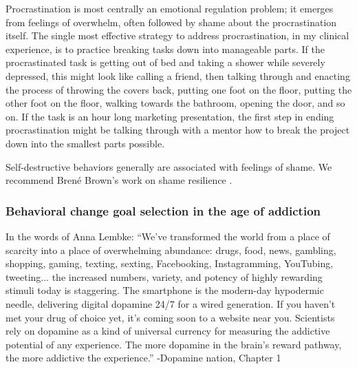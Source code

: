 \documentclass[12pt,letterpaper]{article}
\begin{document}
Procrastination is most centrally an emotional regulation problem; it emerges from feelings of overwhelm, often followed by shame about the procrastination itself. The single most effective strategy to address procrastination, in my clinical experience, is to practice breaking tasks down into manageable parts. If the procrastinated task is getting out of bed and taking a shower while severely depressed, this might look like calling a friend, then talking through and enacting the process of throwing the covers back, putting one foot on the floor, putting the other foot on the floor, walking towards the bathroom, opening the door, and so on. If the task is an hour long marketing presentation, the first step in ending procrastination might be talking through with a mentor how to break the project down into the smallest parts possible.

Self-destructive behaviors generally are associated with feelings of shame. We recommend Brené Brown's work on shame resilience \cite{brownThought}.

\subsubsection*{Behavioral change goal selection in the age of addiction}

In the words of Anna Lembke: “We've transformed the world from a place of scarcity into a place of overwhelming abundance: drugs, food, news, gambling, shopping, gaming, texting, sexting, Facebooking, Instagramming, YouTubing, tweeting... the increased numbers, variety, and potency of highly rewarding stimuli today is staggering. The smartphone is the modern-day hypodermic needle, delivering digital dopamine 24/7 for a wired generation. If you haven't met your drug of choice yet, it's coming soon to a website near you. Scientists rely on dopamine as a kind of universal currency for measuring the addictive potential of any experience. The more dopamine in the brain's reward pathway, the more addictive the experience.” -Dopamine nation, Chapter 1
\end{document}

